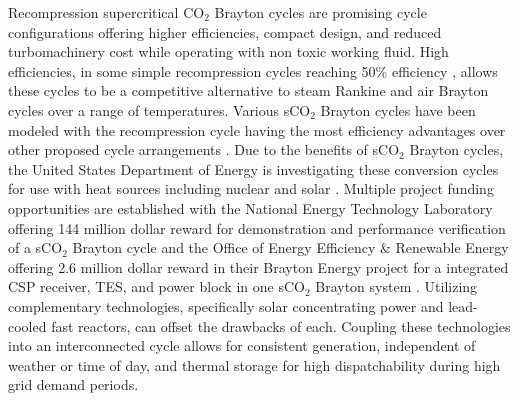 Recompression supercritical CO$_2$ Brayton cycles are promising cycle configurations offering higher efficiencies, compact design, and reduced turbomachinery cost while operating with non toxic working fluid. High efficiencies, in some simple recompression cycles reaching 50\% efficiency \cite{turchi_2013,wright_2009}, allows these cycles to be a competitive alternative to steam Rankine and air Brayton cycles over a range of temperatures.
Various sCO$_2$ Brayton cycles have been modeled with the recompression cycle having the most efficiency advantages over other proposed cycle arrangements \cite{turchi_2013,ahn_2014,wang_2018}.  Due to the benefits of sCO$_2$ Brayton cycles, the United States Department of Energy is investigating these conversion cycles for use with heat sources including nuclear and solar \cite{doe_2012}. Multiple project funding opportunities are established with the National Energy Technology Laboratory offering 144 million dollar reward for demonstration and performance verification of a sCO$_2$ Brayton cycle \cite{netl_2016} and the Office of Energy Efficiency \& Renewable Energy offering 2.6 million dollar reward in their Brayton Energy project for a integrated CSP receiver, TES, and power block in one sCO$_2$ Brayton system \cite{seto_2015}. Utilizing complementary technologies, specifically solar concentrating power and lead-cooled fast reactors, can offset the drawbacks of each. Coupling these technologies into an interconnected cycle allows for consistent generation, independent of weather or time of day, and thermal storage for high dispatchability during high grid demand periods.

